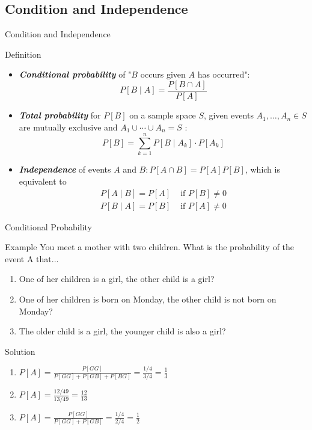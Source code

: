\documentclass{beamer}
\newcommand{\bb}[1]{\textcolor{antiquefuchsia}{\textbf{\textit{#1}}}}
\begin{document}
\subsection{Condition and Independence}
\begin{frame}{Condition and Independence}
\begin{block}{Definition}
\begin{itemize}
\item \bb{Conditional probability} of "$B$ occurs given $A$ has occurred":
$$
P[B \mid A]=\frac{P[B \cap A]}{P[A]}
$$
\item \bb{Total probability} for $P[B]$ on a sample space $S$, given events $A_{1}, \ldots, A_{n} \in S$ are mutually exclusive and $A_{1} \cup \cdots \cup A_{n}=S$ :
$$
P[B]=\sum_{k=1}^{n} P\left[B \mid A_{k}\right] \cdot P\left[A_{k}\right]
$$
\item \bb{Independence} of events $A$ and $B: P[A \cap B]=P[A] P[B]$, which is equivalent to
$$
\begin{array}{ll}
P[A \mid B]=P[A] & \text { if } P[B] \neq 0 \\
P[B \mid A]=P[B] & \text { if } P[A] \neq 0
\end{array}
$$
\end{itemize}
\end{block}
\end{frame}

\begin{frame}{Conditional Probability}
\begin{block}{Example}
You meet a mother with two children. What is the probability of the event A that...
\begin{enumerate}
\item One of her children is a girl, the other child is a girl?
\item One of her children is born on Monday, the other child is not born on Monday?
\item The older child is a girl, the younger child is also a girl?
\end{enumerate}
\end{block}
\pause
\begin{block}{Solution}
\begin{enumerate}
\item $P[A]=\frac{P[GG]}{P[GG]+P[GB]+P[BG]}=\frac{1/4}{3/4}=\frac{1}{3}$
\item $P[A]=\frac{12/49}{13/49}=\frac{12}{13}$
\item $P[A]=\frac{P[GG]}{P[GG]+P[GB]}=\frac{1/4}{2/4}=\frac{1}{2}$
\end{enumerate}
\end{block}
\end{frame}
\end{document}
